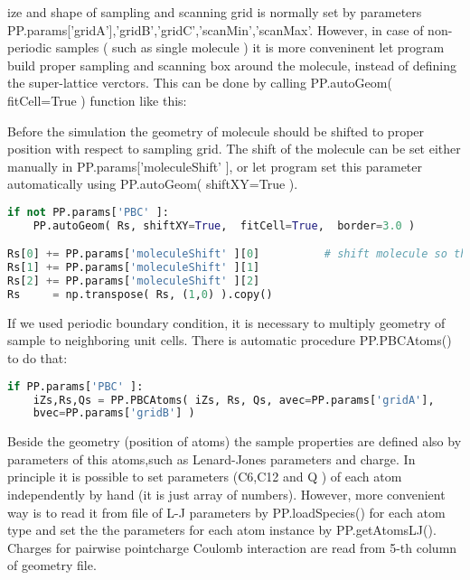 ize and shape of sampling and scanning grid is normally set by parameters
PP.params['gridA'],'gridB','gridC','scanMin','scanMax'. However, in case of
non-periodic samples ( such as single molecule ) it is more conveninent let
program build proper sampling and scanning box around the molecule, instead of
defining the super-lattice verctors. This can be done by calling PP.autoGeom(
fitCell=True ) function like this:

Before the simulation the geometry of molecule should be shifted to proper
position with respect to sampling grid. The shift of the molecule can be set
either manually in PP.params['moleculeShift' ], or let program set this
parameter automatically using PP.autoGeom( shiftXY=True ).



\begin{shadedbox}
    \begin{lstlisting}[language=python]
if not PP.params['PBC' ]:
    PP.autoGeom( Rs, shiftXY=True,  fitCell=True,  border=3.0 )

Rs[0] += PP.params['moleculeShift' ][0]          # shift molecule so that we sample reasonable part of potential
Rs[1] += PP.params['moleculeShift' ][1]
Rs[2] += PP.params['moleculeShift' ][2]
Rs     = np.transpose( Rs, (1,0) ).copy()

   \end{lstlisting}
\end{shadedbox}

If we used periodic boundary condition, it is necessary to multiply geometry of
sample to neighboring unit cells. There is automatic procedure PP.PBCAtoms() to
do that:

\begin{shadedbox}
    \begin{lstlisting}[language=python]
if PP.params['PBC' ]:
    iZs,Rs,Qs = PP.PBCAtoms( iZs, Rs, Qs, avec=PP.params['gridA'],
    bvec=PP.params['gridB'] )
   \end{lstlisting}
\end{shadedbox}


Beside the geometry (position of atoms) the sample properties are defined also
by parameters of this atoms,such as Lenard-Jones parameters and charge. In
principle it is possible to set parameters (C6,C12 and Q ) of each atom
independently by hand (it is just array of numbers). However, more convenient
way is to read it from file of L-J parameters by PP.loadSpecies() for each atom
type and set the the parameters for each atom instance by PP.getAtomsLJ().
Charges for pairwise pointcharge Coulomb interaction are read from 5-th column
of geometry file.

